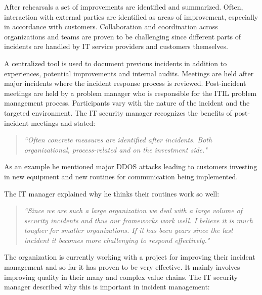 After rehearsals a set of improvements are identified and summarized. Often, interaction with external parties are identified as areas of improvement, especially in accordance with customers. Collaboration and coordination across organizations and teams are proven to be challenging since different parts of incidents are handled by IT service providers and customers themselves. 

A centralized tool is used to document previous incidents in addition to experiences, potential improvements and internal audits. Meetings are held after major incidents where the incident response process is reviewed. Post-incident meetings are held by a problem manager who is responsible for the ITIL problem management process. Participants vary with the nature of the incident and the targeted environment. The IT security manager recognizes the benefits of post-incident meetings and stated:

\begin{quote}
\textit{``Often concrete measures are identified after incidents. Both organizational, process-related and on the investment side."}
\end{quote}

As an example he mentioned major DDOS attacks leading to customers investing in new equipment and new routines for communication being implemented. 


The IT manager explained why he thinks their routines work so well:

\begin{quote}
\textit{``Since we are such a large organization we deal with a large volume of security incidents and thus our frameworks work well. I believe it is much tougher for smaller organizations. If it has been years since the last incident it becomes more challenging to respond effectively."}
\end{quote}

The organization is currently working with a project for improving their incident management and so far it has proven to be very effective. It mainly involves improving quality in their many and complex value chains. The IT security manager described why this is important in incident management:

